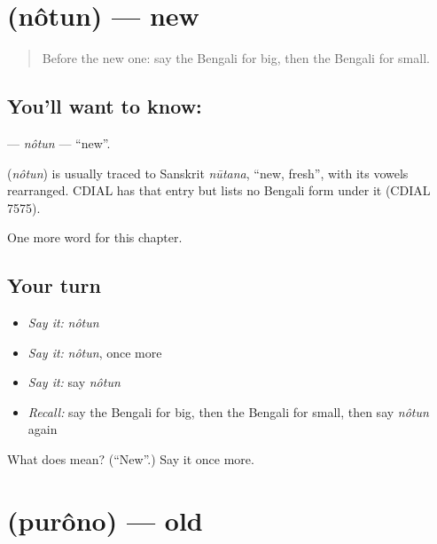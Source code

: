 \section[\texorpdfstring{\bn{নতুন} (nôtun)}{নতুন (nôtun)}]{ (nôtun) — new}

\label{lesson:BN-C72-notun}



\begin{quote}
Before the new one: say the Bengali for big, then the Bengali for small.
\end{quote}

\subsection*{You'll want to know: }
\textbf{} — \emph{nôtun} — \textquotedblleft{}new\textquotedblright{}.

\begin{cousinweb}
\textbf{} (\emph{nôtun}) is usually traced to Sanskrit \emph{nūtana}, \textquotedblleft{}new, fresh\textquotedblright{}, with its vowels rearranged. CDIAL has that entry but lists no Bengali form under it (CDIAL 7575).
\end{cousinweb}

\begin{grammarlens}[title={What you've built}]
One more word for this chapter.
\end{grammarlens}

\subsection*{Your turn}
\begin{itemize}
\raggedright
  \item \emph{Say it:} \emph{nôtun}
  \item \emph{Say it:} \emph{nôtun}, once more
  \item \emph{Say it:} say \emph{nôtun}
  \item \emph{Recall:} say the Bengali for big, then the Bengali for small, then say \emph{nôtun} again
\end{itemize}

\begin{tcolorbox}[breakable,colback=teal!4,colframe=teal!35!black,title={Before you move on}]
What does  mean? (\textquotedblleft{}New\textquotedblright{}.) Say it once more.
\end{tcolorbox}
\section[\texorpdfstring{\bn{পুরনো} (purôno)}{পুরনো (purôno)}]{ (purôno) — old}


